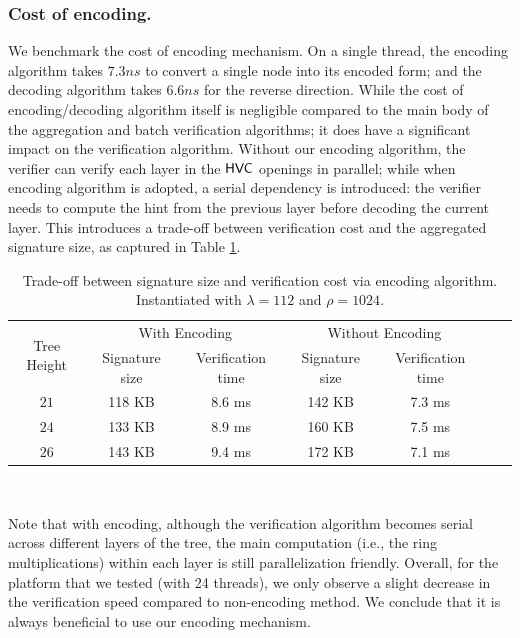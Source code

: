 \subsubsection{Cost of encoding.}
We benchmark the cost of encoding mechanism. On a single thread, the encoding algorithm takes $7.3 ns$ to convert a single node into its encoded form; and the decoding algorithm takes $6.6 ns$ for the reverse direction.
While the cost of encoding/decoding algorithm itself is negligible compared to the main body of the aggregation and batch verification algorithms; it does have a significant impact on the verification algorithm.
Without our encoding algorithm, the verifier can verify each layer in the $\mathsf{HVC}$ openings in parallel; while when encoding algorithm is adopted, a serial dependency is introduced: the verifier needs to compute the hint from the previous layer before decoding the current layer.
This introduces a trade-off between verification cost and the aggregated signature size, as captured in Table \ref{tab:encode_trade_off}.
\begin{table}[t]\centering
  \begin{tabular}{c|cc|cccc}
    \multirow{2}{*}{Tree Height}   &  \multicolumn{2}{c|}{With Encoding}      & \multicolumn{2}{c}{Without Encoding}  \\\cline{2-5}
                  &   Signature size  & Verification time & Signature size    & Verification time                     \\\toprule
      $21$        &       118 KB      &        8.6 ms     &    142 KB         &      7.3 ms                           \\
      $24$        &       133 KB      &        8.9 ms     &    160 KB         &      7.5 ms                           \\
      $26$        &       143 KB      &        9.4 ms     &    172 KB         &      7.1 ms                           \\\bottomrule

  \end{tabular}\\
  \caption{Trade-off between signature size and verification cost via encoding algorithm. Instantiated with $\lambda = 112$ and $\rho = 1024$.}
  \label{tab:encode_trade_off}
\end{table}

Note that with encoding, although the verification algorithm becomes serial across different layers of the tree, the main computation (i.e., the ring multiplications) within each layer is still parallelization friendly.
Overall, for the platform that we tested (with 24 threads), we only observe a slight decrease in the verification speed compared to non-encoding method. 
We conclude that it is always beneficial to use our encoding mechanism.


